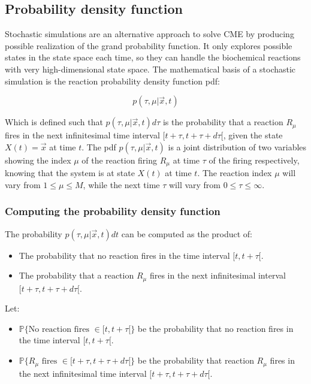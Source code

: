   \subsection{Probability density function}
  Stochastic simulations are an alternative approach to solve CME by producing possible realization of the grand probability function.
  It only explores possible states in the state space each time, so they can handle the biochemical reactions with very high-dimensional state space.
  The mathematical basis of a stochastic simulation is the reaction probability density function pdf:

  $$p(\tau, \mu|\vec{x}, t)$$

  Which is defined such that $p(\tau, \mu |\vec{x}, t)d\tau$ is the probability that a reaction $R_\mu$ fires in the next infinitesimal time interval $[t+\tau,t+\tau+d\tau[$, given the state $X(t) = \vec{x}$ at time $t$.
  The pdf $p(\tau, \mu|\vec{x}, t)$ is a joint distribution of two variables showing the index $\mu$ of the reaction firing $R_\mu$ at time $\tau$ of the firing respectively, knowing that the system is at state $X(t)$ at time $t$.
  The reaction index $\mu$ will vary from $1\le\mu\le M$, while the next time $\tau$ will vary from $0\le \tau\le\infty$.


    \subsubsection{Computing the probability density function}
    The probability $p(\tau, \mu|\vec{x}, t)dt$ can be computed as the product of:

    \begin{multicols}{2}
      \begin{itemize}
        \item The probability that no reaction fires in the time interval $[t, t+\tau[$.
        \item The probability that a reaction $R_\mu$ fires in the next infinitesimal interval $[t+\tau, t+\tau+d\tau[$.
      \end{itemize}
    \end{multicols}

    Let:

    \begin{multicols}{2}
      \begin{itemize}
        \item $\mathbb{P}\{\text{No reaction fires }\in[t,t+\tau[\}$ be the probability that no reaction fires in the time interval $[t, t+\tau[$.
        \item $\mathbb{P}\{R_\mu\text{ fires }\in[t+\tau, t+\tau+d\tau[\}$ be the probability that reaction $R_\mu$ fires in the next infinitesimal time interval $[t+\tau, t+\tau+d\tau[$.
      \end{itemize}
    \end{multicols}

